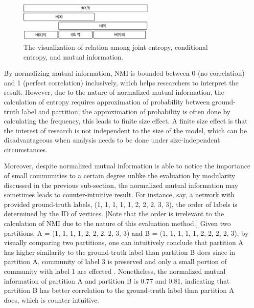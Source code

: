 \documentclass[12pt]{article}
\begin{document}
\begin{figure}
\centering
\includegraphics[width=0.6\textwidth]{fig_4.png}

\caption{\label{fig:fig_4}The visualization of relation among joint entropy, conditional entropy, and mutual information.}
\end{figure}
By normalizing mutual information, NMI is bounded between 0 (no correlation) and 1 (perfect correlation) inclusively, which helps researchers to interpret the result. However, due to the nature of normalized mutual information, the calculation of entropy requires approximation of  probability between ground-truth label and partition; the approximation of probability is often done by calculating the frequency, this leads to finite size effect\cite{10}. A finite size effect is that the interest of research is not independent to the size of the model, which can be disadvantageous when analysis needs to be done under size-independent circumstances.

\bigbreak

Moreover, despite normalized mutual information is able to notice the importance of small communities to a certain degree unlike the evaluation by modularity discussed in the previous sub-section, the normalized mutual information may sometimes leads to counter-intuitive result. For instance, say, a network with provided ground-truth labels, (1, 1, 1, 1, 1, 2, 2, 2, 3, 3), the order of labels is determined by the ID of vertices. [Note that the order is irrelevant to the calculation of NMI due to the nature of this evaluation method.] Given two partitions, A = (1, 1, 1, 1, 2, 2, 2, 2, 3, 3) and B = (1, 1, 1, 1, 1, 2, 2, 2, 2, 3), by visually comparing two partitions, one can intuitively conclude that partition A has higher similarity to the ground-truth label than partition B does since in partition A, community of label 3 is preserved and only a small portion of community with label 1 are effected . Nonetheless, the normalized mutual information of partition A and partition B is 0.77 and 0.81, indicating that partition B has better correlation to the ground-truth label than partition A does, which is counter-intuitive.
\end{document}
